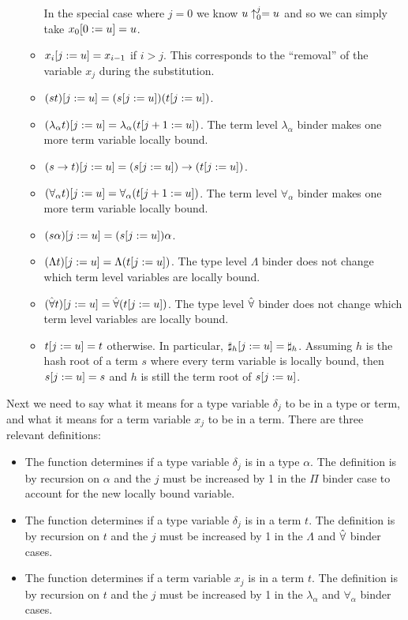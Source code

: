 \begin{itemize}
\begin{itemize}
In the special case where $j=0$ we know $\dbsh{0}{j}{u} = u$
and so we can simply take $\dbsub{0}{u}{x_0} = u$.
\item $\dbsub{j}{u}{x_i} = x_{i-1}$ if $i>j$. This corresponds to the ``removal'' of the variable $x_j$ during the substitution.
\item $\dbsub{j}{u}{(st)} = (\dbsub{j}{u}{s}) (\dbsub{j}{u}{t})$.
\item $\dbsub{j}{u}{(\lambda_\alpha t)} = \lambda_\alpha (\dbsub{j+1}{u}{t})$. The term level $\lambda_\alpha$ binder makes one more term variable locally bound.
\item $\dbsub{j}{u}{(s\to t)} = (\dbsub{j}{u}{s}) \to (\dbsub{j}{u}{t})$.
\item $\dbsub{j}{u}{(\forall_\alpha t)} = \forall_\alpha (\dbsub{j+1}{u}{t})$. The term level $\forall_\alpha$ binder makes one more term variable locally bound.
\item $\dbsub{j}{u}{(s\alpha)} = (\dbsub{j}{u}{s}) \alpha$.
\item $\dbsub{j}{u}{(\Lambda t)} = \Lambda (\dbsub{j}{u}{t})$. The type level $\Lambda$ binder does not change which term level variables are locally bound.
\item $\dbsub{j}{u}{(\tforall t)} = \tforall (\dbsub{j}{u}{t})$. The type level $\tforall$ binder does not change which term level variables are locally bound.
\item $\dbsub{j}{u}{t} = t$ otherwise. In particular, $\dbsub{j}{u}{\tmh{h}} = \tmh{h}$.
Assuming $h$ is the hash root of a term $s$ where every term variable is locally bound,
then $\dbsub{j}{u}{s} = s$
and $h$ is still the term root of $\dbsub{j}{u}{s}$.
\end{itemize}
\end{itemize}

Next we need to say what it means for a type variable $\delta_j$ to be {}
in a type or term, and what it means for a term variable $x_j$ to be {}
in a term.
There are three relevant definitions:
\begin{itemize}
\item The function {} determines if a type variable $\delta_j$
is {} in a type $\alpha$. The definition is by recursion on $\alpha$ and the $j$ must be
increased by 1 in the $\Pi$ binder case to account for the new locally bound variable.
\item The function {} determines if a type variable $\delta_j$
is {} in a term $t$. The definition is by recursion on $t$ and the $j$ must be
increased by 1 in the $\Lambda$ and $\tforall$ binder cases.
\item The function {} determines if a term variable $x_j$
is {} in a term $t$. The definition is by recursion on $t$ and the $j$ must be
increased by 1 in the $\lambda_\alpha$ and $\forall_\alpha$ binder cases.
\end{itemize}

